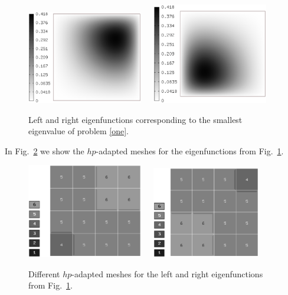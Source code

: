 \documentclass[smallextended]{svjour3}
\begin{document}
\begin{figure}[!ht]
\begin{center}
\includegraphics[width=0.45\textwidth]{eig1.eps}\ \ \ 
\includegraphics[width=0.45\textwidth]{eig2.eps}\\
\end{center}
\caption{Left and right eigenfunctions corresponding to the smallest eigenvalue of problem \eqref{one}. }
\label{fig:eigen1}
\end{figure}
\noindent
In Fig.~\ref{fig:mesh1} we show the $hp$-adapted meshes for the eigenfunctions from Fig.~\ref{fig:eigen1}.
\newpage

\begin{figure}[!ht]
\begin{center}
\includegraphics[width=0.45\textwidth]{mesh1.eps}\ \ \ 
\includegraphics[width=0.42\textwidth]{mesh2.eps}\\
\end{center}
\caption{Different $hp$-adapted meshes for the left and right eigenfunctions from Fig.~\ref{fig:eigen1}. }
\label{fig:mesh1}
\end{figure}
\end{document}

